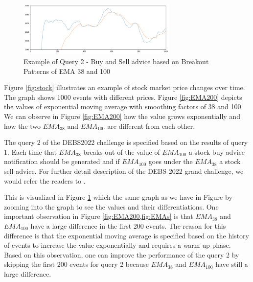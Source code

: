 \begin{figure}[!ht]
    \begin{center}
        \includegraphics[width=0.70\textwidth]{./images/query2_example.png}
        \caption{Example of Query 2 - Buy and Sell advice based on Breakout Patterns of EMA 38 and 100 }
        \label{fig:EMAs}
    \end{center}
\end{figure}




Figure \ref{fig:stock} illustrates an example of stock market price changes over time. The graph shows 1000 events with 
different prices. Figure \ref{fig:EMA200} depicts the values of exponential moving average with 
smoothing factors of 38 and 100. We can observe in Figure \ref{fig:EMA200} how the value grows exponentially 
and how the two $EMA_{38}$ and $EMA_{100}$ are different from each other. 

The query 2 of the DEBS2022 challenge \cite{debs2022challenge} is specified based on the results of query 1. Each time 
that $EMA_{38}$ breaks out of the value of $EMA_{100}$ a stock buy advice notification should be generated and if
$EMA_{100}$ goes under the $EMA_{38}$ a stock sell advice. For further detail description of the DEBS 2022 
grand challenge, we would refer the readers to \cite{debs2022challenge}. 

This is visualized in Figure \ref{fig:EMAs} which the same graph as we have in Figure \label{fig:EMAs} by 
zooming into the graph to see the values and their differentiations. One important observation in 
Figure \ref{fig:EMA200,fig:EMAs} is that $EMA_{38}$ and $EMA_{100}$ have a large difference in the first 
200 events.  The reason for this difference is that the exponential moving average is specified based 
on the history of events to increase the value exponentially and requires a warm-up phase. Based on this observation,
one can improve the performance of the query 2 by skipping the first 200 events for query 2 because 
$EMA_{38}$ and $EMA_{100}$ have still a large difference. 



